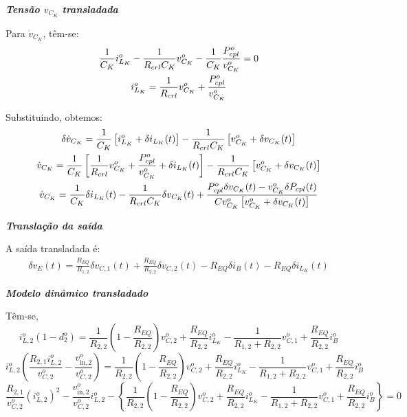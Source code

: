\textbf{\textit{Tensão $v_{C_K}$ transladada}} \vspace*{12pt}

Para $\dot{v}_{C_K}$, têm-se:
\begin{gather*}
  \frac{1}{C_K} i_{L_K}^o - \frac{1}{R_{crl} C_K} v_{C_K}^o - \frac{1}{C_K} \frac{P_{cpl}^o}{v_{C_K}^o} = 0 \nle
  i_{L_K}^o = \frac{1}{R_{crl}} v_{C_K}^o + \frac{P_{cpl}^o}{v_{C_K}^o}
\end{gather*}

Substituindo, obtemos:
\begin{gather*}
  \delta \dot{v}_{C_K} = \frac{1}{C_K} \left[i_{L_K}^o + \delta i_{L_K}(t)\right]
  - \frac{1}{R_{crl} C_K} \left[v_{C_K}^o + \delta v_{C_K}(t)\right] \nle
  \dot{v}_{C_K} = \frac{1}{C_K} \left[\frac{1}{R_{crl}} v_{C_K}^o + \frac{P_{cpl}^o}{v_{C_K}^o} + \delta i_{L_K}(t)\right]
  - \frac{1}{R_{crl} C_K} \left[v_{C_K}^o + \delta v_{C_K}(t)\right] \nle
  \dot{v}_{C_K} = \frac{1}{C_K} \delta i_{L_K}(t)
  - \frac{1}{R_{crl} C_K} \delta v_{C_K}(t)
  + \frac{P_{cpl}^o \delta v_{C_K}(t) - v_{C_K}^o \delta P_{cpl}(t)}{Cv_{C_K}^o\left[v_{C_K}^o + \delta v_{C_K}(t)\right]}
\end{gather*}

\textbf{\textit{Translação da saída}} \vspace*{12pt}

A saída transladada é:
\begin{gather}
  \delta v_E(t) = \frac{R_{EQ}}{R_{1,2}} \delta v_{C,1}(t) + \frac{R_{EQ}}{R_{2,2}} \delta v_{C,2}(t) - R_{EQ} \delta i_B(t) - R_{EQ} \delta i_{L_K}(t)
\end{gather}


\textbf{\textit{Modelo dinâmico transladado}} \vspace*{12pt}

Têm-se,
\begin{equation*}
  i_{L,2}^o \left(1 - d_2^o\right) = \frac{1}{R_{2,2}} \left(1 - \frac{R_{EQ}}{R_{2,2}}\right) v_{C,2}^o + \frac{R_{EQ}}{R_{2,2}} i_{L_K}^o - \frac{1} {R_{1,2} + R_{2,2}} v_{C,1}^o + \frac{R_{EQ}}{R_{2,2}} i_B^o
\end{equation*}
\begin{equation*}
  i_{L,2}^o \left(\frac{R_{2,1}i_{L,2}^o}{v_{C,2}^o} - \frac{v_{\text{in},2}^o}{v_{C,2}^o}\right) = \frac{1}{R_{2,2}} \left(1 - \frac{R_{EQ}}{R_{2,2}}\right) v_{C,2}^o + \frac{R_{EQ}}{R_{2,2}} i_{L_K}^o - \frac{1} {R_{1,2} + R_{2,2}} v_{C,1}^o + \frac{R_{EQ}}{R_{2,2}} i_B^o
\end{equation*}
\begin{equation*}
  \frac{R_{2,1}}{v_{C,2}^o}({i_{L,2}^o})^2 - \frac{v_{\text{in},2}^o}{v_{C,2}^o}{i_{L,2}^o}
  - \left\{\frac{1}{R_{2,2}} \left(1 - \frac{R_{EQ}}{R_{2,2}}\right) v_{C,2}^o + \frac{R_{EQ}}{R_{2,2}} i_{L_K}^o - \frac{1} {R_{1,2} + R_{2,2}} v_{C,1}^o + \frac{R_{EQ}}{R_{2,2}} i_B^o \right\} = 0
\end{equation*}

